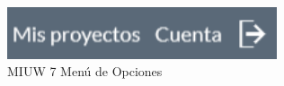 \begin{figure}[H]
    \centering
    \includegraphics[width=300px]{capitulo4/imagenes/web/IUW_7.png}
    \caption{MIUW 7 Menú de Opciones}
    \label{fig:MIUW-7}
\end{figure}